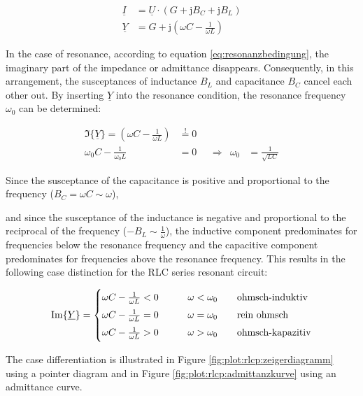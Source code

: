 \begin{frame}
{            \begin{align}
                \underline{I} &= \underline{U} \cdot \left(G + \mathrm{j}B_C + \mathrm{j}B_L\right)\\
                \underline{Y} &= G + \mathrm{j}\left(\omega C - \frac{1}{\omega L}\right)\label{eq:rlcp:y}
            \end{align}
            
            In the case of resonance, according to equation \ref{eq:resonanzbedingung}, the imaginary part of the impedance or admittance disappears.
            Consequently, in this arrangement, the susceptances of inductance $B_L$ and capacitance $B_C$ cancel each other out.
            By inserting $\underline{Y}$ into the resonance condition, the resonance frequency $\omega_0$ can be determined:
        
            \begin{equation}\label{eq:rlcp:w0}
                \begin{aligned}
                    \Im\{\underline{Y}\} = \left(\omega C - \frac{1}{\omega L}\right) &\overset{!}{=} 0 \\
                    \omega_0 C - \frac{1}{\omega_0 L} &= 0 &&\Rightarrow& \omega_0 &= \frac{1}{\sqrt{LC}}
                \end{aligned}
            \end{equation}
        
            Since the susceptance of the capacitance is positive and proportional to the frequency ($B_C = \omega C \sim \omega$),
            
            and since the susceptance of the inductance is negative and proportional to the reciprocal of the frequency ($-B_L \sim \frac{1}{\omega}$),
            the inductive component predominates for frequencies below the resonance frequency and the capacitive component predominates for frequencies above the resonance frequency.
            This results in the following case distinction for the RLC series resonant circuit:
        
            \begin{equation}
                \Im\{\underline{Y}\} =
            \begin{cases}
                \omega C - \frac{1}{\omega L} < 0 & \qquad \omega < \omega_0 \qquad\text{ohmsch-induktiv}\vphantom{\Big|}\\
                \omega C - \frac{1}{\omega L} = 0 & \qquad \omega = \omega_0 \qquad\text{rein ohmsch}\vphantom{\Big|}\\
                \omega C - \frac{1}{\omega L} > 0 & \qquad \omega > \omega_0 \qquad\text{ohmsch-kapazitiv}\vphantom{\Big|}
            \end{cases}
            \label{eq:rlcp:fallunterscheidung}
            \end{equation}
        
            The case differentiation is illustrated in Figure \ref{fig:plot:rlcp:zeigerdiagramm} using a pointer diagram 
            and in Figure \ref{fig:plot:rlcp:admittanzkurve} using an admittance curve.
        }%
\end{frame}

